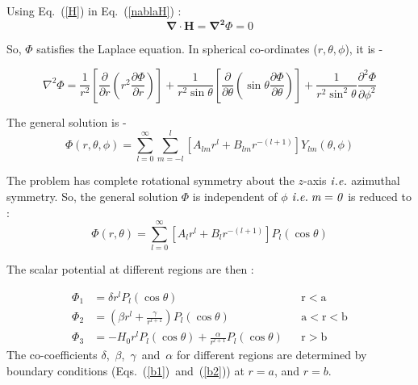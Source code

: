 Using Eq.~(\ref{H}) in Eq.~(\ref{nablaH}) :
\begin{equation}
\bm{\nabla}\cdot\bm{H}=\bm{\nabla^2}\Phi=0
\end{equation}


So, $\Phi$ satisfies the Laplace equation.  In spherical co-ordinates ($r, \theta, \phi$), it is -

\begin{equation}
\nabla^2 \Phi=\frac{1}{r^2}\left[\frac{\partial }{\partial r} \left(r^2\frac{\partial \Phi}{\partial r}\right) \right]+ \frac{1}{r^2 \sin\theta}\left[\frac{\partial }{\partial \theta} \left(\sin\theta\frac{\partial \Phi}{\partial \theta}\right) \right]+ \frac{1}{r^2 \sin^2\theta}\frac{\partial^2 \Phi}{\partial \phi^2}
\end{equation}

The general solution is -
\begin{equation}
\Phi(r,\theta, \phi)=\sum_{l=0}^{\infty}\sum_{m=-l}^l [A_{lm}r^l+B_{lm}r^{-(l+1)}]Y_{lm}(\theta, \phi)
\end{equation}

The problem has complete rotational symmetry about the $z$-axis $\it{i.e.}$ azimuthal symmetry. So, the general solution $\Phi$ is independent of $\phi$ $\it{i.e.}\;m=0$ is reduced to :
\begin{equation}
\Phi(r,\theta)=\sum_{l=0}^{\infty} [A_lr^l+B_lr^{-(l+1)}]P_l(\cos\theta)
\end{equation}

The scalar potential at different regions are then : 


\begin{align}
    \Phi_1 &= \delta r^l P_l(\cos\theta) && \mathrm{r<a} \label{r<a} \\
    \Phi_2 &= \left(\beta r^l+\frac{\gamma}{r^{l+1}}\right)P_l(\cos\theta) && \mathrm{a<r<b} \label{a<r<b} \\
    \Phi_3 &= -H_0 r^l P_l(\cos\theta)+\frac{\alpha}{r^{l+1}}P_l(\cos\theta) && \mathrm{r>b} \label{r>b} 
\end{align}
The co-coefficients $\delta$,~$\beta$,~$\gamma$~and~$\alpha$ for different regions are determined by boundary conditions (Eqs.~(\ref{b1})~and~(\ref{b2})) at $r=a$, and $r=b$.

